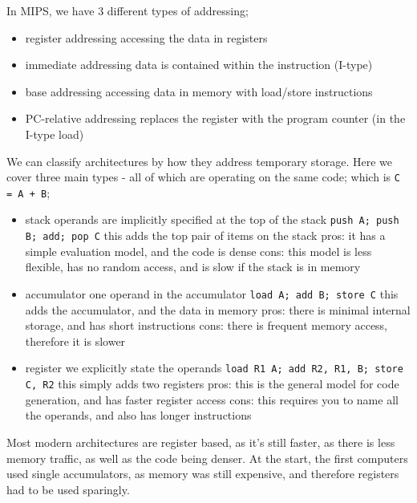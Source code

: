 \documentclass[a4paper, 12pt]{article}
\begin{document}
            In MIPS, we have 3 different types of addressing;
            \begin{itemize}
                \itemsep0em
                \item register addressing \hfill accessing the data in registers
                \item immediate addressing \hfill data is contained within the instruction (I-type)
                \item base addressing \hfill accessing data in memory with load/store instructions
                \item PC-relative addressing \hfill replaces the register with the program counter (in the I-type load)
            \end{itemize}
            We can classify architectures by how they address temporary storage. Here we cover three main types - all of which are operating on the same code; which is \texttt{C = A + B};
            \begin{itemize}
                \itemsep0em
                \item stack \hfill operands are implicitly specified at the top of the stack
                    \subitem \texttt{push A; push B; add; pop C}
                    \subitem this adds the top pair of items on the stack
                    \subitem pros: it has a simple evaluation model, and the code is dense
                    \subitem cons: this model is less flexible, has no random access, and is slow if the stack is in memory
                \item accumulator \hfill one operand in the accumulator
                    \subitem \texttt{load A; add B; store C}
                    \subitem this adds the accumulator, and the data in memory
                    \subitem pros: there is minimal internal storage, and has short instructions
                    \subitem cons: there is frequent memory access, therefore it is slower
                \item register \hfill we explicitly state the operands
                    \subitem \texttt{load R1 A; add R2, R1, B; store C, R2}
                    \subitem this simply adds two registers
                    \subitem pros: this is the general model for code generation, and has faster register access
                    \subitem cons: this requires you to name all the operands, and also has longer instructions
            \end{itemize}
            Most modern architectures are register based, as it's still faster, as there is less memory traffic, as well as the code being denser. At the start, the first computers used single accumulators, as memory was still expensive, and therefore registers had to be used sparingly.
\end{document}
